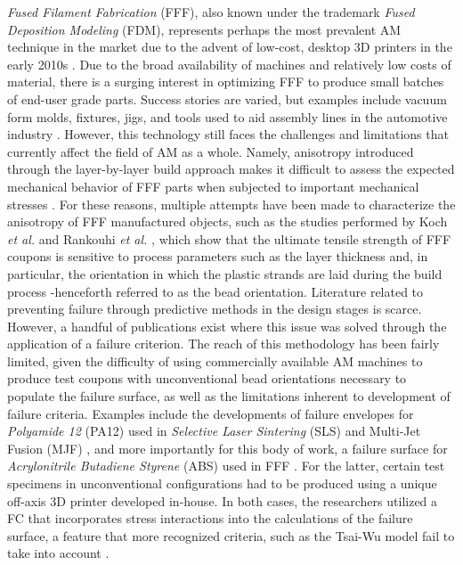 \documentclass[main.tex]{subfiles}
\begin{document}
\emph{Fused Filament Fabrication} (FFF), also known under the trademark \emph{Fused Deposition Modeling} (FDM\texttrademark), represents perhaps the most prevalent AM technique in the market due to the advent of low-cost, desktop 3D printers in the early 2010s \cite{Capote2017}. Due to the broad availability of machines and relatively low costs of material, there is a surging interest in optimizing FFF to produce small batches of end-user grade parts. Success stories are varied, but examples include vacuum form molds, fixtures, jigs, and tools used to aid assembly lines in the automotive industry \cite{Hartman2014, VanHulle2017,deVries2017}. However, this technology still faces the challenges and limitations that currently affect the field of AM as a whole. Namely, anisotropy introduced through the layer-by-layer build approach makes it difficult to assess the expected mechanical behavior of FFF parts when subjected to important mechanical stresses \cite{Capote2017}. For these reasons, multiple attempts have been made to characterize the anisotropy of FFF manufactured objects, such as the studies performed by Koch \emph{et al.} \cite{Koch2017} and Rankouhi \emph{et al.} \cite{Rankouhi2016}, which show that the ultimate tensile strength of FFF coupons is sensitive to process parameters such as the layer thickness and, in particular, the orientation in which the plastic strands are laid during the build process -henceforth referred to as the bead orientation. Literature related to preventing failure through predictive methods in the design stages is scarce. However, a handful of publications exist where this issue was solved through the application of a failure criterion. The reach of this methodology has been fairly limited, given the difficulty of using commercially available AM machines to produce test coupons with unconventional bead orientations necessary to populate the failure surface, as well as the limitations inherent to development of failure criteria. Examples include the developments of failure envelopes for \emph{Polyamide 12} (PA12) used in \emph{Selective Laser Sintering} (SLS) and Multi-Jet Fusion (MJF) \cite{Obst2018, Osswald2020}, and more importantly for this body of work, a failure surface for \emph{Acrylonitrile Butadiene Styrene} (ABS) used in FFF \cite{MazzeiCapote2019}. For the latter, certain test specimens in unconventional configurations had to be produced using a unique off-axis 3D printer developed in-house. In both cases, the researchers utilized a FC that incorporates stress interactions into the calculations of the failure surface, a feature that more recognized criteria, such as the Tsai-Wu model fail to take into account \cite{Osswald2017a}.
\end{document}
